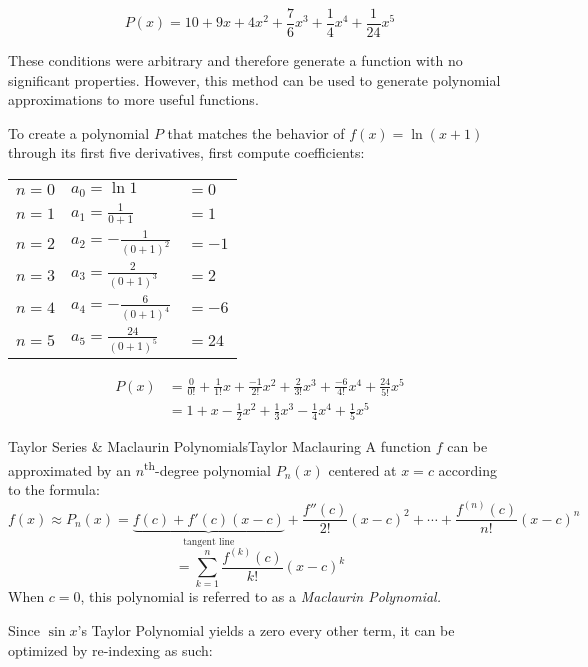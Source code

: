 \documentclass{article}
\theoremstyle{definition}
\begin{document}
\[P(x)=10+9x+4x^2+\frac{7}{6}x^3+\frac{1}{4}x^4+\frac{1}{24}x^5\]

These conditions were arbitrary and therefore generate a function with no significant properties. However, this method can be used to generate polynomial approximations to more useful functions.

\newpage

To create a polynomial $P$ that matches the behavior of $f(x)=\ln (x+1)$ through its first five derivatives, first compute coefficients:

\begin{center}
\begin{tabular}{l l l}
$n=0$    &$a_0=\ln 1$ & $= 0$ \\
$n=1$    &$a_1=\frac{1}{0+1}$ & $=1$ \\
$n=2$    &$a_2=-\frac{1}{(0+1)^2}$ & $= -1$ \\
$n=3$    &$a_3=\frac{2}{(0+1)^3}$ & $= 2$ \\
$n=4$    &$a_4=-\frac{6}{(0+1)^4}$ & $= -6$ \\
$n=5$    &$a_5=\frac{24}{(0+1)^5}$ & $= 24$ \\
\end{tabular}
\end{center}

\begin{equation}
\begin{split}
    P(x)&=\frac{0}{0!}+\frac{1}{1!}x+\frac{-1}{2!}x^2+\frac{2}{3!}x^3+\frac{-6}{4!}x^4+\frac{24}{5!}x^5 \\
    &= 1+x-\frac{1}{2}x^2+\frac{1}{3}x^3-\frac{1}{4}x^4+\frac{1}{5}x^5
\end{split}
\end{equation}


\begin{theorem}{Taylor Series \& Maclaurin Polynomials}{Taylor Maclauring}
    A function $f$ can be approximated by an $n$\textsuperscript{th}-degree polynomial $P_n(x)$ centered at $x=c$ according to the formula:
    \[f(x) \approx P_n(x)= \underbrace{f(c)+f'(c)(x-c)}_{\text{tangent line}}+\frac{f''(c)}{2!}(x-c)^2 + \cdots + \frac{f^{(n)}(c)}{n!}(x-c)^n\]
    \[= \sum_{k=1}^{n} \frac{f^{(k)}(c)}{k!}(x-c)^k\]
    When $c=0$, this polynomial is referred to as a \textit{Maclaurin Polynomial.}
\end{theorem}

Since $\sin x $'s Taylor Polynomial yields a zero every other term, it can be optimized by re-indexing as such:

\vspace{1cm}

\begin{center}
\end{center}
\end{document}
